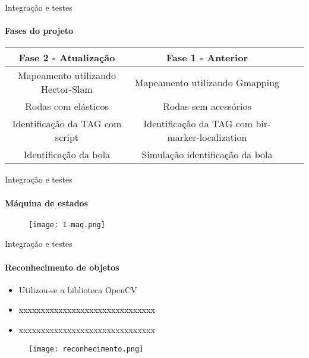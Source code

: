 \begin{frame}[t]{Integração e testes}
    \framesubtitle{Fases do projeto}
    \begin{table}[ht!]
        \centering
            \begin{tabular}{|c|c|c|c|} \hline
                \textbf{Fase 2 - Atualização }&\textbf{Fase 1 - Anterior}\\\hline
                Mapeamento utilizando Hector-Slam & Mapeamento utilizando Gmapping \\ \hline
                Rodas com elásticos & Rodas sem acessórios \\ \hline
                Identificação da TAG com script & Identificação da TAG com bir-marker-localization \\ \hline
                Identificação da bola  & Simulação identificação da bola\\ \hline
            \end{tabular}
        \end{table}
\end{frame}

\begin{frame}[t]{Integração e testes}
    \framesubtitle{Máquina de estados}
    \begin{figure}
        \texttt{[image: 1-maq.png]}
    \end{figure}
\end{frame}

\begin{frame}[t]{Integração e testes}
    \framesubtitle{Reconhecimento de objetos}
    \begin{itemize}
        \item Utilizou-se a biblioteca OpenCV
        \item xxxxxxxxxxxxxxxxxxxxxxxxxxxxxxx
        \item xxxxxxxxxxxxxxxxxxxxxxxxxxxxxxx
    \end{itemize}
    \vspace*{0.4cm}
    \begin{figure}
        \texttt{[image: reconhecimento.png]}
    \end{figure}
\end{frame}

